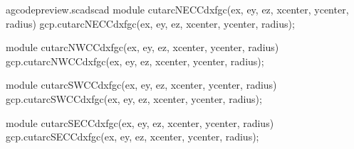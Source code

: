 \documentclass{ltxdoc}
\begin{document}
\lstset{firstnumber=\thegcpscad}
\begin{writecode}{a}{gcodepreview.scad}{scad}
module cutarcNECCdxfgc(ex, ey, ez, xcenter, ycenter, radius){
    gcp.cutarcNECCdxfgc(ex, ey, ez, xcenter, ycenter, radius);
}

module cutarcNWCCdxfgc(ex, ey, ez, xcenter, ycenter, radius){
    gcp.cutarcNWCCdxfgc(ex, ey, ez, xcenter, ycenter, radius);
}

module cutarcSWCCdxfgc(ex, ey, ez, xcenter, ycenter, radius){
    gcp.cutarcSWCCdxfgc(ex, ey, ez, xcenter, ycenter, radius);
}

module cutarcSECCdxfgc(ex, ey, ez, xcenter, ycenter, radius){
    gcp.cutarcSECCdxfgc(ex, ey, ez, xcenter, ycenter, radius);
}

\end{writecode}
\addtocounter{gcpscad}{16}

%
\end{document}
